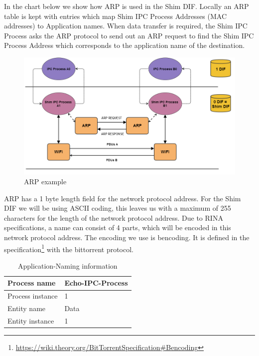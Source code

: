 \npar

In the chart below we show how ARP is used in the Shim DIF. Locally an ARP table is kept with entries which map Shim IPC Process Addresses (MAC addresses) to Application names. When data transfer is required, the Shim IPC Process asks the ARP protocol to send out an ARP request to find the Shim IPC Process Address which corresponds to the application name of the destination. 

\npar

\begin{figure}[H]
    \centering
    \includegraphics[width=1\textwidth]{figures/arp_example}
    \caption{ARP example} 
    \label{fig:arp_example}
\end{figure}

\npar

ARP has a 1 byte length field for the network protocol address. For the Shim DIF we will be using ASCII coding, this leaves us with a maximum of 255 characters for the length of the network protocol address. Due to RINA specifications, a name can consist of 4 parts, which will be encoded in this network protocol address. The encoding we use is bencoding. It is defined in the specification\footnote{\url{https://wiki.theory.org/BitTorrentSpecification\#Bencoding}} with the bittorrent protocol.

\npar

\begin{table}[H]
	\begin{center}
		\begin{tabular}{|l|l|}
			\hline
				Process name & Echo-IPC-Process  \\ \hline
				Process instance & 1 \\ \hline
				Entity name & Data \\ \hline
				Entity instance & 1 \\ \hline
		\end{tabular}
		\caption{Application-Naming information}
	\end{center}
\end{table}

